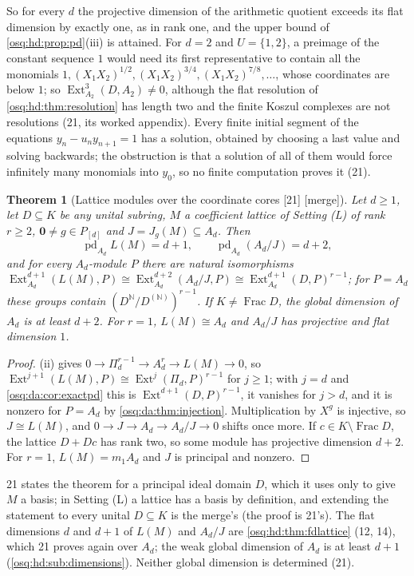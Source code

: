 \documentclass[11pt,letterpaper]{article}
\numberwithin{equation}{section}
\newtheorem{theorem}{Theorem}[section]
\theoremstyle{definition}
\theoremstyle{remark}
\theoremstyle{plain}
\newcommand{\N}{\mathbb N}
\newcommand{\Frac}{\operatorname{Frac}}
\newcommand{\Ext}{\operatorname{Ext}}
\newcommand{\pd}{\operatorname{pd}}
\newcommand{\src}[1]{\textup{\textsf{[#1]}}}
\newcommand{\merge}{\textup{\textsf{[merge]}}}
\begin{document}
So for every $d$ the projective dimension of the arithmetic quotient exceeds its flat dimension by exactly one, as in rank one, and the
upper bound of \cref{osq:hd:prop:pd}(iii) is attained. For $d=2$ and $U=\{1,2\}$, a preimage of the constant sequence $1$ would need its first
representative to contain all the monomials $1,(X_1X_2)^{1/2},(X_1X_2)^{3/4},(X_1X_2)^{7/8},\dots$, whose coordinates are below $1$; so
$\Ext^3_{A_2}(D,A_2)\ne0$, although the flat resolution of \cref{osq:hd:thm:resolution} has length two and the finite Koszul complexes are not
resolutions (21, its worked appendix). Every finite initial segment of the equations $y_n-u_ny_{n+1}=1$ has a solution, obtained by
choosing a last value and solving backwards; the obstruction is that a solution of all of them would force infinitely many monomials into
$y_0$, so no finite computation proves it (21).

\begin{theorem}[Lattice modules over the coordinate cores \src{21} \merge]\label{osq:da:thm:lattice}
Let $d\ge1$, let $D\subseteq K$ be any unital subring, $M$ a coefficient lattice of Setting (L) of rank $r\ge2$, $\mathbf0\ne g\in P_{[d]}$ and
$J=J_g(M)\subseteq A_d$. Then
\[
 \pd_{A_d}L(M)=d+1,\qquad \pd_{A_d}(A_d/J)=d+2,
\]
and for every $A_d$-module $P$ there are natural isomorphisms
$\Ext^{d+1}_{A_d}(L(M),P)\cong\Ext^{d+2}_{A_d}(A_d/J,P)\cong\Ext^{d+1}_{A_d}(D,P)^{r-1}$; for $P=A_d$ these groups contain
$(D^{\N}/D^{(\N)})^{r-1}$. If $K\ne\Frac D$, the global dimension of $A_d$ is at least $d+2$. For $r=1$, $L(M)\cong A_d$ and $A_d/J$ has
projective and flat dimension $1$.
\end{theorem}
\begin{proof}
(ii) gives $0\to\Pi_d^{r-1}\to A_d^r\to L(M)\to0$, so $\Ext^{j+1}(L(M),P)\cong\Ext^j(\Pi_d,P)^{r-1}$ for $j\ge1$;
with $j=d$ and \cref{osq:da:cor:exactpd} this is $\Ext^{d+1}(D,P)^{r-1}$, it vanishes for $j>d$, and it is nonzero for $P=A_d$ by
\cref{osq:da:thm:injection}. Multiplication by $X^g$ is injective, so $J\cong L(M)$, and $0\to J\to A_d\to A_d/J\to0$ shifts once more. If
$c\in K\setminus\Frac D$, the lattice $D+Dc$ has rank two, so some module has projective dimension $d+2$. For $r=1$, $L(M)=m_1A_d$ and $J$ is
principal and nonzero.
\end{proof}

21 states the theorem for a principal ideal domain $D$, which it uses only to give $M$ a basis; in Setting (L) a lattice has a basis by
definition, and extending the statement to every unital $D\subseteq K$ is the merge's (the proof is 21's). The flat dimensions $d$ and $d+1$
of $L(M)$ and $A_d/J$ are \cref{osq:hd:thm:fdlattice} (12, 14), which 21 proves again over $A_d$; the weak global dimension of $A_d$ is at
least $d+1$ (\cref{osq:hd:sub:dimensions}). Neither global dimension is determined (21).
\end{document}

